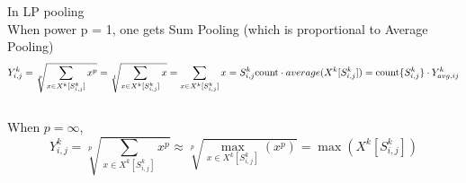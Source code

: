 \documentclass{article}
\begin{document}
In LP pooling\\
When power p = 1, one gets Sum Pooling (which is proportional to Average Pooling)
\begin{equation}
        Y^k_{i,j} = \sqrt[p]{\sum_{x \in X^k[S^k_{i,j}]} x^{p}} = \sqrt[1]{\sum_{x \in X^k[S^k_{i,j}]} x} = \sum_{x \in X^k[S^k_{i,j}]} x = 
        S^k_{i,j}\text{count} \cdot average(X^k[S^k_{i,j}])\\ 
        =\text{count}\{S^k_{i,j}\}\cdot Y^k_{avg,ij}
\end{equation}
\\
When $p = \infty$,
\begin{equation}
        Y^k_{i,j} = \sqrt[p]{\sum_{x \in X^k[S^k_{i,j}]} x^{p}} \approx \sqrt[p]{\max_{x \in X^k[S^k_{i,j}]} (x^{p})} = \max(X^k[S^k_{i,j}])
\end{equation}
\end{document}
